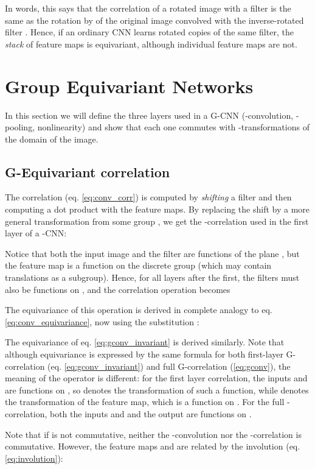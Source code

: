 \documentclass{article}
\begin{document}
In words, this says that the correlation of a rotated image  with a filter  is the same as the rotation by  of the original image  convolved with the inverse-rotated filter .
Hence, if an ordinary CNN learns rotated copies of the same filter, the \emph{stack} of feature maps is equivariant, although individual feature maps are not.


\section{Group Equivariant Networks}
\label{sec:equivariance_of_GCNNs}

In this section we will define the three layers used in a G-CNN (-convolution, -pooling, nonlinearity) and show that each one commutes with -transformations of the domain of the image.


\subsection{G-Equivariant correlation}
\label{sec:g_equivariant_convolution}

The correlation (eq. \ref{eq:conv_corr}) is computed by \emph{shifting} a filter and then computing a dot product with the feature maps.
By replacing the shift by a more general transformation from some group , we get the -correlation used in the first layer of a -CNN:

Notice that both the input image  and the filter  are functions of the plane , but the feature map  is a function on the discrete group  (which may contain translations as a subgroup).
Hence, for all layers after the first, the filters  must also be functions on , and the correlation operation becomes


The equivariance of this operation is derived in complete analogy to eq. \ref{eq:conv_equivariance}, now using the substitution :

The equivariance of eq. \ref{eq:gconv_invariant} is derived similarly.
Note that although equivariance is expressed by the same formula  for both first-layer G-correlation (eq. \ref{eq:gconv_invariant}) and full G-correlation (\ref{eq:gconv}), the meaning of the operator  is different:
for the first layer correlation, the inputs  and  are functions on , so  denotes the transformation of such a function, while  denotes the transformation of the feature map, which is a function on .
For the full -correlation, both the inputs  and  and the output  are functions on .

Note that if  is not commutative, neither the -convolution nor the -correlation is commutative.
However, the feature maps  and  are related by the involution (eq. \ref{eq:involution}):
\end{document}
